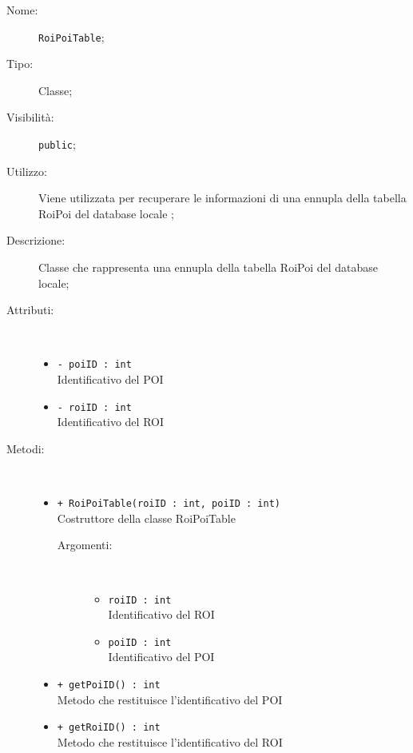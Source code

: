 \documentclass[../DefinizioneDiProdotto.tex]{subfiles}
\begin{document}
\begin{description}
	\item[Nome:] \texttt{RoiPoiTable};
	\item[Tipo:] Classe;
	\item[Visibilità:] \texttt{public};
	\item[Utilizzo:] Viene utilizzata per recuperare le informazioni di una ennupla della tabella RoiPoi del database locale ;
	\item[Descrizione:] Classe che rappresenta una ennupla della tabella RoiPoi del database locale;
	\item[Attributi:] \
	\begin{itemize}
		\item \texttt{- poiID : int}\\
		Identificativo del POI
		
		\item \texttt{- roiID : int}\\
		Identificativo del ROI
		
	\end{itemize}
	\item[Metodi:] \
	\begin{itemize}
		\item \texttt{+ RoiPoiTable(roiID : int, poiID : int)}\\
		Costruttore della classe RoiPoiTable
		\begin{description}
			\item[Argomenti:] \
			\begin{itemize}
				\item \texttt{roiID : int}\\
				Identificativo del ROI\item \texttt{poiID : int}\\
				Identificativo del POI\end{itemize}
		\end{description}
		\item \texttt{+ getPoiID() : int}\\
		Metodo che restituisce l'identificativo del POI
		\item \texttt{+ getRoiID() : int}\\
		Metodo che restituisce l'identificativo del ROI
	\end{itemize}
\end{description}
\end{document}
